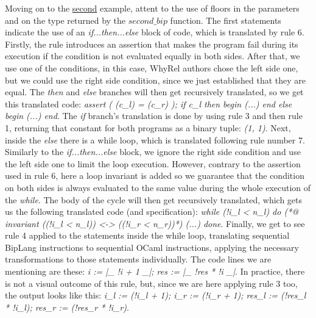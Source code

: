 Moving on to the \hyperref[fig:trans-ex-second]{second} example, attent to the use of floors in the parameters and on the type returned by the $second\_bip$ function.
The first statements indicate the use of an \emph{if...then...else} block of code, which is translated by rule 6.
Firstly, the rule introduces an assertion that makes the program fail during its execution if the condition is not evaluated equally in both sides.
After that, we use one of the conditions, in this case, WhyRel authors chose the left side one, but we could use the right side condition, since we just established that they are equal.
The \emph{then} and \emph{else} branches will then get recursively translated, so we get this translated code: \emph{assert ( (c\_l) = (c\_r) ); if c\_l then begin (...) end else begin (...) end}. 
The \emph{if} branch's translation is done by using rule 3 and then rule 1, returning that constant for both programs as a binary tuple: \emph{(1, 1)}.
Next, inside the \emph{else} there is a while loop, which is translated following rule number 7.
Similarly to the \emph{if...then...else} block, we ignore the right side condition and use the left side one to limit the loop execution.
However, contrary to the assertion used in rule 6, here a loop invariant is added so we guarantee that the condition on both sides is always evaluated to the same value during the whole execution of the \emph{while}.
The body of the cycle will then get recursively translated, which gets us the following translated code (and specification): \emph{while (!i\_l < n\_l) do (*@ invariant ((!i\_l < n\_l)) <-> ((!i\_r < n\_r))*) (...) done}.
Finally, we get to see rule 4 applied to the statements inside the while loop, translating sequential BipLang instructions to sequential OCaml instructions, applying the necessary transformations to those statements individually.
The code lines we are mentioning are these: \emph{i := |\_ !i + 1 \_|; res := |\_ !res * !i \_|}.
In practice, there is not a visual outcome of this rule, but, since we are here applying rule 3 too, the output looks like this: \emph{i\_l := (!i\_l + 1); i\_r := (!i\_r + 1); res\_l := (!res\_l * !i\_l); res\_r := (!res\_r * !i\_r)}.

